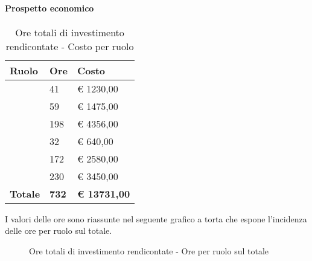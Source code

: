 			\paragraph{Prospetto economico} %
			\label{par:prospetto_economico}
				\begin{table}[!ht]
					\begin{center}
						\begin{tabularx}{0.65\textwidth}{|l|l|X|}
							\hline
							\textbf{Ruolo} & \textbf{Ore} & \textbf{Costo} \\
							\hline
							\roleProjectManager & 41 & \euro{} 1230,00 \\
							\hline
							\roleAnalyst & 59 & \euro{} 1475,00 \\
							\hline
							\roleDesigner & 198 & \euro{} 4356,00 \\
							\hline
							\roleAdministrator & 32 & \euro{} 640,00 \\
							\hline
							\roleProgrammer & 172 & \euro{} 2580,00 \\
							\hline
							\roleVerifier & 230 & \euro{} 3450,00 \\
							\hline
							\textbf{Totale} & \textbf{732} & \textbf{\euro{} 13731,00} \\
							\hline
						\end{tabularx}
					\end{center}
				\caption{Ore totali di investimento rendicontate - Costo per ruolo}
				\end{table}
				
				\noindent
				I valori delle ore sono riassunte nel seguente grafico a torta che espone l’incidenza delle ore per ruolo sul totale.
				\begin{center}
					\begin{figure}[htbp]
					\vspace{0.8cm}
					\caption{Ore totali di investimento rendicontate - Ore per ruolo sul totale}
					\end{figure}
				\end{center}

